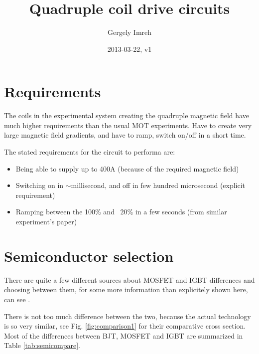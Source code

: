 \documentclass[12pt,a4paper]{article}
\author{Gergely Imreh}
\title{Quadruple coil drive circuits}
\date{2013-03-22, v1}
\begin{document}
\maketitle

\tableofcontents

\section{Requirements}

The coils in the experimental system creating the quadruple magnetic field have much higher requirements than the usual MOT experiments. Have to create very large magnetic field gradients, and have to ramp, switch on/off in a short time.

The stated requirements for the circuit to performa are: 
\begin{itemize} \itemsep -2pt
\item Being able to supply up to 400A (because of the required magnetic field)
\item Switching on in $\sim$millisecond, and off in few hundred microsecond (explicit requirement)
\item Ramping between the 100\% and ~20\% in a few seconds (from similar experiment's paper)
\end{itemize}


\section{Semiconductor selection}

There are quite a few different sources about MOSFET and IGBT differences and choosing between them, for some more information than explicitely shown here, can see \citet{Blake,Linder2006,Melito2005}.

There is not too much difference between the two, because the actual technology is so very similar, see Fig. \ref{fig:comparison1} for their comparative cross section. Most of the differences between BJT, MOSFET and IGBT are summarized in Table \ref{tab:semicompare}.
\end{document}

